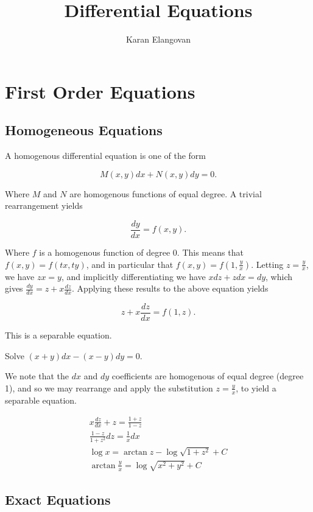 \documentclass[]{article}
\title{Differential Equations}
\author{Karan Elangovan}
\begin{document}
 
\doublespacing
\maketitle

\section{First Order Equations}

\subsection{Homogeneous Equations}

A homogenous differential equation is one of the form

\[
		M(x,y) dx + N(x,y) dy = 0
.\] 

Where $M$ and $N$ are homogenous functions of equal degree. A trivial rearrangement yields 

\[
		\frac{dy}{dx} = f(x,y)
.\] 

Where $f$ is a homogenous function of degree $0$. This means that $f(x,y) = f(tx, ty)$, and in particular that $f(x,y) = f(1, \frac{y}{x})$. Letting $z = \frac{y}{x}$, we have $zx = y$, and implicitly differentiating we have $xdz + zdx = dy$, which gives $\frac{dy}{dx} = z + x \frac{dz}{dx}$. Applying these results to the above equation yields

\[
		z + x \frac{dz}{dx} = f(1,z)
.\] 

This is a separable equation.


\begin{eg}
		Solve $(x+y) dx - (x-y) dy = 0$.

		We note that the $dx$ and $dy$ coefficients are homogenous of equal degree (degree 1), and so we may rearrange and apply the substitution $z = \frac{y}{x}$, to yield a separable equation.

		\begin{align*}
				x \frac{dz}{dx} + z = \frac{1+z}{1-z} \\
				\frac{1-z}{1+z^2} dz = \frac{1}{x} dx \\
				\log x = \arctan z - \log \sqrt{1+z^2} + C \\
				\arctan \frac{y}{x} = \log \sqrt{x^2 + y^2} + C
		\end{align*}
\end{eg}

\subsection{Exact Equations}
\end{document}
